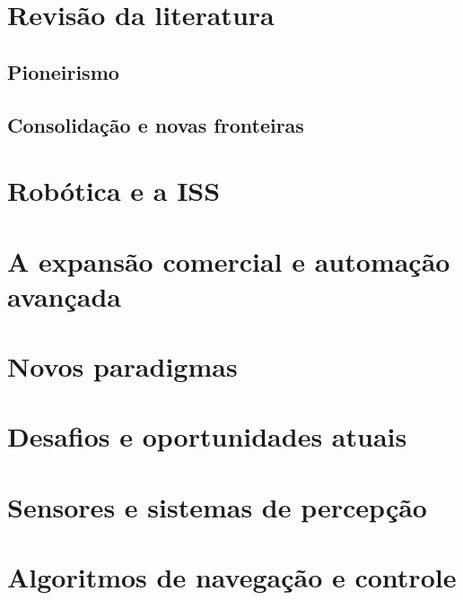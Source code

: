 \section{Revisão da literatura}

\subsection{Pioneirismo}



\subsection{Consolidação e novas fronteiras}


\section{Robótica e a ISS}


\section{A expansão comercial e automação avançada}


\section{Novos paradigmas}


\section{Desafios e oportunidades atuais}


\section{Sensores e sistemas de percepção}








\section{Algoritmos de navegação e controle}


